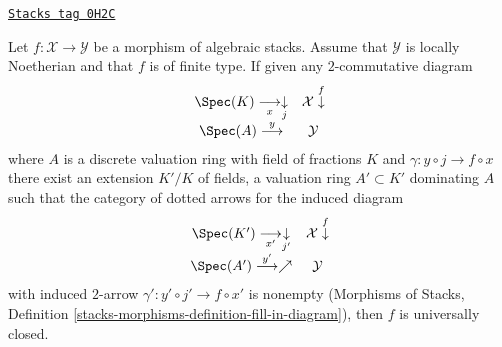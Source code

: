 \begin{lemma}
\label{stacks-more-morphisms-lemma-valuative-criterion-universally-closed}
\href{https://stacks.math.columbia.edu/tag/0H2C}{\texttt{Stacks tag 0H2C}}

Let $f : \mathcal{X} \to \mathcal{Y}$ be a morphism of algebraic stacks.
Assume that $\mathcal{Y}$ is locally Noetherian and that $f$ is of finite type.
If given any $2$-commutative diagram
$$
\begin{array}{cc}\Spec(K) \underset{x}{\longrightarrow}\underset{j}{\downarrow} & \mathcal{X} \overset{f}{\downarrow} \\ \Spec(A) \overset{y}{\longrightarrow} & \mathcal{Y}\end{array}
$$
where $A$ is a discrete valuation ring with field of fractions $K$
and $\gamma : y \circ j \to f \circ x$ there exist an extension $K'/K$
of fields, a valuation ring $A' \subset K'$ dominating $A$ such that
the category of dotted arrows for the induced diagram
$$
\begin{array}{cc}\Spec(K') \underset{x'}{\longrightarrow}\underset{j'}{\downarrow} & \mathcal{X} \overset{f}{\downarrow} \\ \Spec(A') \overset{y'}{\longrightarrow}\nearrow & \mathcal{Y}\end{array}
$$
with induced $2$-arrow $\gamma' : y' \circ j' \to f \circ x'$
is nonempty (Morphisms of Stacks, Definition
\ref{stacks-morphisms-definition-fill-in-diagram}), then $f$ is
universally closed.
\end{lemma}

